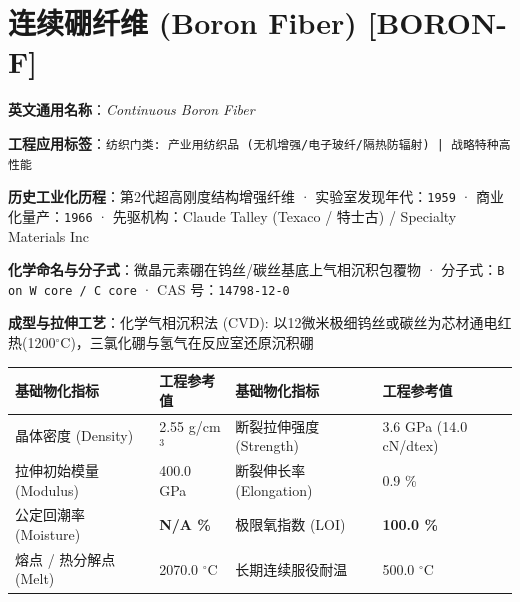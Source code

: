 \documentclass[11pt,openright,twoside,UTF8]{ctexbook}
\begin{document}
\section{连续硼纤维 (Boron Fiber) [BORON-F]}
\label{sec:boron-f}

\noindent\textbf{英文通用名称}：\textit{Continuous Boron Fiber}\par
\noindent\textbf{工程应用标签}：\texttt{纺织门类: 产业用纺织品 (无机增强/电子玻纤/隔热防辐射) | 战略特种高性能}\par
\noindent\textbf{历史工业化历程}：第2代超高刚度结构增强纤维 · 实验室发现年代：\texttt{1959} · 商业化量产：\texttt{1966} · 先驱机构：Claude Talley (Texaco / 特士古) / Specialty Materials Inc\par
\noindent\textbf{化学命名与分子式}：微晶元素硼在钨丝/碳丝基底上气相沉积包覆物 · 分子式：\texttt{B on W core / C core} · CAS 号：\texttt{14798-12-0}\par
\noindent\textbf{成型与拉伸工艺}：化学气相沉积法 (CVD): 以12微米极细钨丝或碳丝为芯材通电红热(1200$^\circ\mathrm{C}$)，三氯化硼与氢气在反应室还原沉积硼\par

\vspace{0.15cm}
\begin{center}
\small
\begin{tabularx}{\textwidth}{p{3.8cm}Xp{3.8cm}X}
\toprule
\textbf{基础物化指标} & \textbf{工程参考值} & \textbf{基础物化指标} & \textbf{工程参考值} \\
\midrule
晶体密度 (Density) & 2.55 g/cm$^3$ & 断裂拉伸强度 (Strength) & 3.6 GPa (14.0 cN/dtex) \\
拉伸初始模量 (Modulus) & 400.0 GPa & 断裂伸长率 (Elongation) & 0.9 \% \\
公定回潮率 (Moisture) & \textbf{N/A \%} & 极限氧指数 (LOI) & \textbf{100.0 \%} \\
熔点 / 热分解点 (Melt) & 2070.0 $^\circ\mathrm{C}$ & 长期连续服役耐温 & 500.0 $^\circ\mathrm{C}$ \\
\bottomrule
\end{tabularx}
\end{center}
\vspace{0.15cm}
\end{document}
